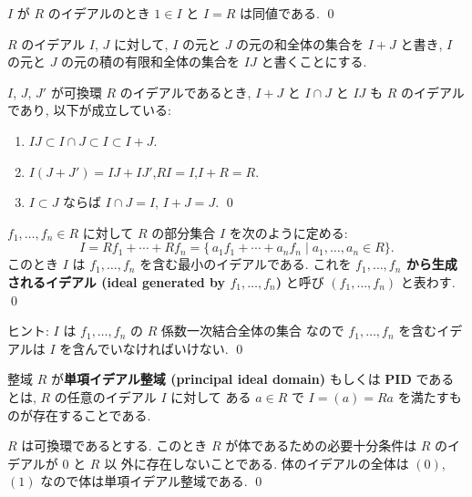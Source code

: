 \documentclass[12pt,twoside]{jarticle}
\begin{document}
\begin{question}
  $I$ が $R$ のイデアルのとき $1\in I$ と $I=R$ は同値である. \qed
\end{question}


$R$ のイデアル $I$, $J$ に対して, 
$I$ の元と $J$ の元の和全体の集合を $I+J$ と書き,
$I$ の元と $J$ の元の積の有限和全体の集合を $IJ$ と書くことにする.

\begin{question}
  $I$, $J$, $J'$ が可換環 $R$ のイデアルであるとき,
  $I+J$ と $I\cap J$ と $IJ$ も $R$ のイデアルであり,
  以下が成立している:
  \begin{enumerate}
  \item $IJ\subset I\cap J\subset I\subset I+J$.
  \item $I(J+J')=IJ+IJ'$,\quad $RI=I$,\quad $I+R=R$.
  \item $I\subset J$ ならば $I\cap J=I$, $I+J=J$.
    \qed
  \end{enumerate}
\end{question}


\begin{question}
  $f_1,\dots,f_n\in R$ に対して $R$ の部分集合 $I$ を次のように定める:
  \begin{equation*}
    I = Rf_1+\cdots+Rf_n 
    = \{\, a_1f_1+\cdots+a_nf_n \mid a_1,\dots,a_n\in R\}.
  \end{equation*}
  このとき $I$ は $f_1,\dots,f_n$ を含む最小のイデアルである.
  これを {\bf $f_1,\dots,f_n$ から生成されるイデアル (ideal generated 
  by $f_1,\dots,f_n$)} と呼び $(f_1,\dots,f_n)$ と表わす. 
  \qed
\end{question}

\noindent
ヒント: $I$ は $f_1,\dots,f_n$ の $R$ 係数一次結合全体の集合
なので $f_1,\dots,f_n$ を含むイデアルは $I$ を含んでいなければいけない.
\qed

\bigskip

整域 $R$ が{\bf 単項イデアル整域 (principal ideal domain)} 
もしくは {\bf PID} であるとは, $R$ の任意のイデアル $I$ に対して
ある $a\in R$ で $I=(a)=Ra$ を満たすものが存在することである.


\begin{question}[体のイデアルによる特徴付け]
\label{q:field-ideal}
  $R$ は可換環であるとする. 
  このとき $R$ が体であるための必要十分条件は $R$ のイデアルが $0$ と $R$ 以
  外に存在しないことである. 
  体のイデアルの全体は $(0)$, $(1)$ なので体は単項イデアル整域である.
  \qed
\end{question}
\end{document}
